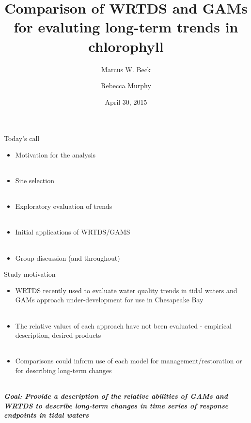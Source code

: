 \documentclass[serif]{beamer}\usepackage[]{graphicx}\usepackage[]{color}
\newcommand{\Bigtxt}[1]{\textbf{\textit{#1}}}
\begin{document}
\title[Comparison of WRTDS and GAMs]{Comparison of WRTDS and GAMs for evaluting long-term trends in chlorophyll}

\author[Beck, Murphy]{Marcus W. Beck \and Rebecca Murphy}

\date{April 30, 2015}


\begin{frame}
\titlepage
\end{frame}

\begin{frame}{Today's call}
\begin{itemize}
\item Motivation for the analysis \\~\\
\item Site selection \\~\\
\item Exploratory evaluation of trends \\~\\
\item Initial applications of WRTDS/GAMS \\~\\
\item Group discussion (and throughout) 
\end{itemize}
\end{frame}

\begin{frame}{Study motivation}
\begin{itemize}
\item WRTDS recently used to evaluate water quality trends in tidal waters and GAMs approach under-development for use in Chesapeake Bay\\~\\
\item The relative values of each approach have not been evaluated - empirical description, desired products \\~\\
\item Comparisons could inform use of each model for management/restoration or for describing long-term changes \\~\\
\end{itemize}
\Bigtxt{Goal: Provide a description of the relative abilities of GAMs and WRTDS to describe long-term changes in time series of response endpoints in tidal waters}
\end{frame}
\end{document}
